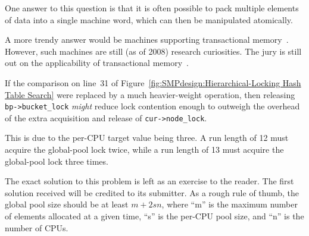 
	One answer to this question is that it is often possible to
	pack multiple elements of data into a single machine word,
	which can then be manipulated atomically.

	A more trendy answer would be machines supporting transactional
	memory~\cite{DBLomet1977SIGSOFT}.
	However, such machines are still (as of 2008) research
	curiosities.
	The jury is still out on the applicability of transactional
	memory~\cite{McKenney2007PLOSTM,DonaldEPorter2007TRANSACT,
	ChistopherJRossbach2007a}.


	If the comparison on line~31 of
	Figure~\ref{fig:SMPdesign:Hierarchical-Locking Hash Table Search}
	were replaced by a much heavier-weight operation,
	then releasing {\tt bp->bucket\_lock} \emph{might} reduce lock
	contention enough to outweigh the overhead of the extra
	acquisition and release of {\tt cur->node\_lock}.


	This is due to the per-CPU target value being three.
	A run length of 12 must acquire the global-pool lock twice,
	while a run length of 13 must acquire the global-pool lock
	three times.


	The exact solution to this problem is left as an exercise to
	the reader.
	The first solution received will be credited to its submitter.
	As a rough rule of thumb, the global pool size should be at least
	$m+2sn$, where
	``m'' is the maximum number of elements allocated at a given time,
	``s'' is the per-CPU pool size,
	and ``n'' is the number of CPUs.


